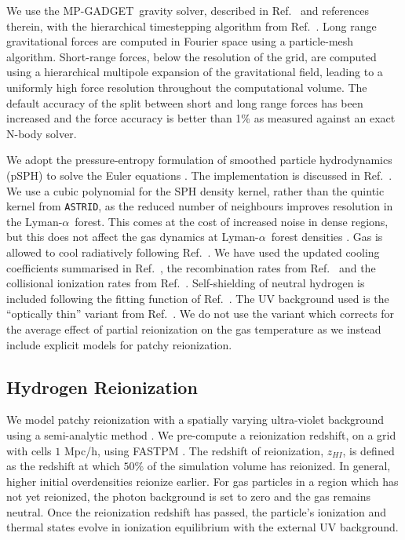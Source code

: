 \documentclass[a4paper,11pt]{article}
\newcommand{\Lya}{Lyman-$\alpha$}
\newcommand{\astrid}{\texttt{ASTRID}}
\newcommand{\mpgadget}{{\small MP-GADGET}}
\begin{document}
We use the \mpgadget~gravity solver, described in Ref.~\cite{Bird:2022} and references therein, with the hierarchical timestepping algorithm from Ref.~\cite{Springel:2021}. Long range gravitational forces are computed in Fourier space using a particle-mesh algorithm. Short-range forces, below the resolution of the grid, are computed using a hierarchical multipole expansion of the gravitational field, leading to a uniformly high force resolution throughout the computational volume. The default accuracy of the split between short and long range forces has been increased and the force accuracy is better than 1\% as measured against an exact N-body solver.

We adopt the pressure-entropy formulation of smoothed particle hydrodynamics (pSPH) to solve the Euler equations \citep{Hopkins:2013,Read:2010}. The implementation is discussed in Ref.~\cite{Feng:2014}. %
We use a cubic polynomial for the SPH density kernel, rather than the quintic kernel from \astrid, as the reduced number of neighbours improves resolution in the \Lya~forest. This comes at the cost of increased noise in dense regions, but this does not affect the gas dynamics at \Lya~forest densities \cite{Bird:2013}.
Gas is allowed to cool radiatively following Ref.~\citep{Katz:1996}.
We have used the updated cooling coefficients summarised in Ref.~\cite{Bolton:2017}, the recombination rates from Ref.~\cite{Verner:1996} and the collisional ionization rates from Ref.~\cite{Voronov:1997}. Self-shielding of neutral hydrogen is included following the fitting function of Ref.~\cite{Rahmati:2013}.
The UV background used is the ``optically thin'' variant from Ref.~\cite{FG2020}. We do not use the variant which corrects for the average effect of partial reionization on the gas temperature as we instead include explicit models for patchy reionization.

\subsection{Hydrogen Reionization}
\label{sec:hydrogen}

We model patchy reionization with a spatially varying ultra-violet background using a semi-analytic method \cite{Battaglia:2013}. We pre-compute a reionization redshift, on a grid with cells $1$ Mpc/h, using FASTPM \cite{FASTPM}. The redshift of reionization, $z_{HI}$, is defined as the redshift at which $50\%$ of the simulation volume has reionized. In general, higher initial overdensities reionize earlier. For gas particles in a region which has not yet reionized, the photon background is set to zero and the gas remains neutral. Once the reionization redshift has passed, the particle's ionization and thermal states evolve in ionization equilibrium with the external UV background.
\end{document}
